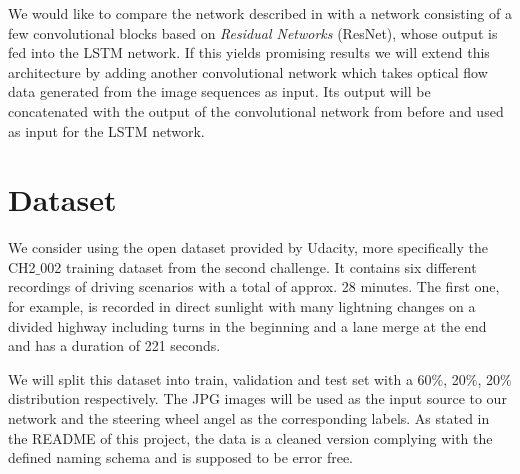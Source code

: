 \documentclass[10pt,twocolumn,letterpaper]{article}
\begin{document}
We would like to compare the network described in\cite{DBLP:journals/corr/BojarskiTDFFGJM16} with a network consisting of a few convolutional blocks based on {\em Residual Networks}\cite{He2015} (ResNet), whose output is fed into the LSTM network. If this yields promising results we will extend this architecture by adding another convolutional network which takes optical flow data generated from the image sequences as input. Its output will be concatenated with the output of the convolutional network from before and used as input for the LSTM network.


\section{Dataset}          
We consider using the open dataset provided by Udacity\cite{udacityDataset}, more specifically the CH2$\_$002 training dataset from the second challenge. It contains six different recordings of driving scenarios with a total of approx. 28 minutes. The first one, for example, is recorded in direct sunlight with many lightning changes on a divided highway including turns in the beginning and a lane merge at the end and has a duration of 221 seconds.

We will split this dataset into train, validation and test set with a 60$\%$, 20$\%$, 20$\%$ distribution respectively. The JPG images will be used as the input source to our network and the steering wheel angel as the corresponding labels. As stated in the README of this project, the data is a cleaned version complying with the defined naming schema and is supposed to be error free.


\end{document}
